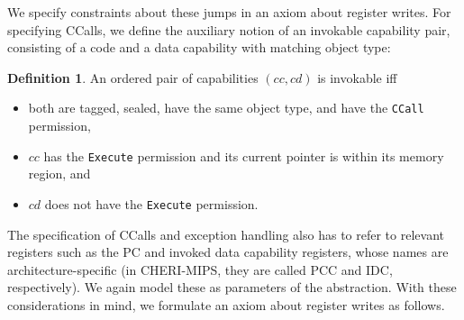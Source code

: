 \documentclass[11pt]{article}
\theoremstyle{definition}
\newtheorem{definition}{Definition}
\newcommand{\Note}[1]{{\color{magenta}[#1]}}
\begin{document}

We specify constraints about these jumps in an axiom about register writes.
For specifying CCalls, we define the auxiliary notion of an
invokable capability pair, consisting of a code and a data capability with
matching object type:

\begin{definition}
  An ordered pair of capabilities $(cc, cd)$ is invokable iff
  \begin{itemize}
  \item both are tagged, sealed, have the same object type, and have the \verb|CCall|
    permission,
  \item $cc$ has the \verb|Execute| permission and its current pointer is within its memory region, and
  \item $cd$ does not have the \verb|Execute| permission.
  \end{itemize}
\end{definition}

The specification of CCalls and exception handling also has to refer to
relevant registers such as the PC and invoked data capability registers, whose
names are architecture-specific (in CHERI-MIPS, they are called PCC and IDC, respectively).
We again model these as parameters of the
abstraction.
With these considerations in mind, we formulate an axiom about
register writes as follows.


\end{document}
